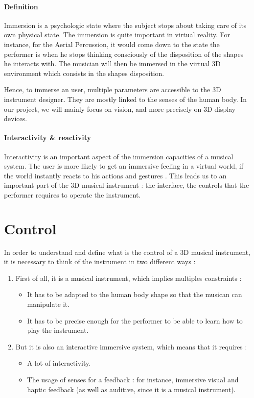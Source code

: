 \paragraph{Definition}
Immersion is a psychologic state where the subject stops about taking care of its own physical state.
The immersion is quite important in virtual reality. For instance, for the Aerial Percussion, it would come down to the state the performer is when he stops thinking consciously of the disposition of the shapes he interacts with. The musician will then be immersed in the virtual 3D environment which consists in the shapes disposition.

Hence, to immerse an user, multiple parameters are accessible to the 3D instrument designer. 
They are mostly linked to the senses of the human body. In our project, we will mainly focus on vision, and more precisely on 3D display devices.

\paragraph{Interactivity \& reactivity}
Interactivity is an important aspect of the immersion capacities of a musical system.
The user is more likely to get an immersive feeling in a virtual world, if the world instantly reacts to his actions and gestures \cite{biocca1995immersive}.
This leads us to an important part of the 3D musical instrument : the interface, the controls that the performer requires to operate the instrument.

\section{Control}
In order to understand and define what is the control of a 3D musical instrument, it is necessary to think of the instrument in two different ways : 
\begin{enumerate}
\item First of all, it is a musical instrument, which implies multiples constraints :
\begin{itemize}
\item It has to be adapted to the human body shape so that the musican can manipulate it.
\item It has to be precise enough for the performer to be able to learn how to play the instrument.
\end{itemize}
\item But it is also an interactive immersive system, which means that it requires :
\begin{itemize}
\item A lot of interactivity.
\item The usage of senses for a feedback : for instance, immersive visual and haptic feedback (as well as auditive, since it is a musical instrument).
\end{itemize} 
\end{enumerate}

